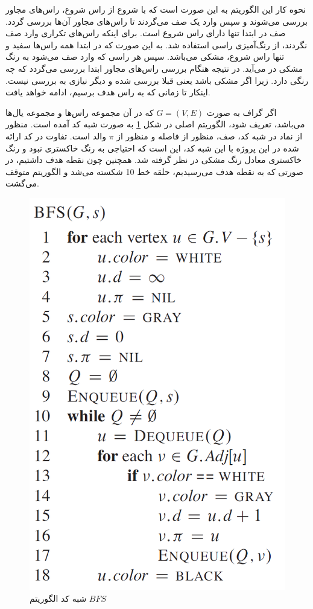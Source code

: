 نحوه کار این الگوریتم به این صورت است که با شروع از راس شروع، راس‌های مجاور بررسی می‌شوند و سپس وارد یک صف می‌گردند تا راس‌های مجاور آن‌ها بررسی گردد. صف در ابتدا تنها دارای راس شروع است. برای اینکه راس‌های تکراری وارد صف نگردند، از رنگ‌آمیزی راسی استفاده شد. به این صورت که در ابتدا همه راس‌ها سفید و تنها راس شروع، مشکی می‌باشد. سپس هر راسی که وارد صف می‌شود به رنگ مشکی در می‌آید. در نتیجه هنگام بررسی راس‌های مجاور ابتدا بررسی می‌گردد که چه رنگی دارد. زیرا اگر مشکی باشد یعنی قبلا بررسی شده و دیگر نیازی به بررسی نیست. اینکار تا زمانی که به راس هدف برسیم، ادامه خواهد یافت.

اگر گراف به صورت 
$G = (V, E)$
که در آن  مجموعه راس‌ها و  مجموعه یال‌ها می‌باشد، تعریف شود، الگوریتم اصلی  در شکل \ref{Fig BFS Algorithm} به صورت شبه کد آمده است. منظور از نماد  در شبه کد، صف، منظور از  فاصله و منظور از $\pi$ والد است. تفاوت در کد ارائه شده در این پروژه با این شبه کد، این است که احتیاجی به رنگ خاکستری نبود و رنگ خاکستری معادل رنگ مشکی در نظر گرفته شد. همچنین چون نقطه هدف داشتیم، در صورتی که به نقطه هدف می‌رسیدیم، حلقه خط 10 شکسته می‌شد و الگوریتم متوقف می‌گشت.
\begin{figure}[!h]
	\centering
	\includegraphics[scale=0.4]{Images/BFS-algorithm.png}
	\caption{شبه کد الگوریتم $BFS$}\label{Fig BFS Algorithm}
\end{figure}

